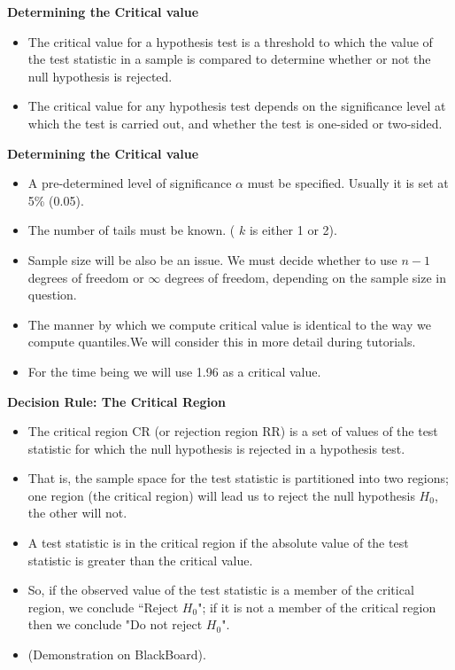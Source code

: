\documentclass[a4]{beamer}
\begin{document}



\noindent \textbf{Determining the Critical value}
\begin{itemize} \item The critical value for a hypothesis test is a threshold to which the value of the test statistic in a sample is compared to determine whether or not the null hypothesis is rejected.

\item The critical value for any hypothesis test depends on the significance level at which the test is carried out, and whether the test is one-sided or two-sided.
\end{itemize}






\noindent \textbf{Determining the Critical value}
\begin{itemize}
\item A pre-determined level of significance $\alpha$ must be specified. Usually it is set at 5\% (0.05).
\item The number of tails must be known. ( $k$ is either 1 or 2).
\item Sample size will be also be an issue. We must decide whether to use $n-1$ degrees of freedom or $\infty$ degrees of freedom, depending on the sample size in question.
\item The manner by which we compute critical value is identical to the way we compute quantiles.We will consider this in more detail during tutorials.
\item For the time being we will use 1.96 as a critical value.
\end{itemize}




\noindent \textbf{Decision Rule:  The Critical Region}
\begin{itemize}
\item The critical region CR (or rejection region RR) is a set of values of the test statistic for which the null hypothesis is rejected in a hypothesis test. \item That is, the sample space for the test statistic is partitioned into two regions; one region (the critical region) will lead us to reject the null hypothesis $H_0$, the other will not.

\item A test statistic is in the critical region if the absolute value of the test statistic is greater than the critical value.
    \item So, if the observed value of the test statistic is a member of the critical region, we conclude ``Reject $H_0$"; if it is not a member of the critical region then we conclude "Do not reject $H_0$".
\item (Demonstration on BlackBoard).
\end{itemize}
\end{document}
